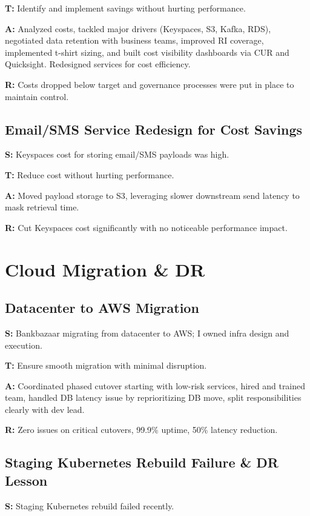 \documentclass[11pt]{article}
\begin{document}
\textbf{T:} Identify and implement savings without hurting performance.

\textbf{A:} Analyzed costs, tackled major drivers (Keyspaces, S3, Kafka, RDS), negotiated data retention with business teams, improved RI coverage, implemented t-shirt sizing, and built cost visibility dashboards via CUR and Quicksight. Redesigned services for cost efficiency.

\textbf{R:} Costs dropped below target and governance processes were put in place to maintain control.

\subsection{Email/SMS Service Redesign for Cost Savings}
\textbf{S:} Keyspaces cost for storing email/SMS payloads was high.

\textbf{T:} Reduce cost without hurting performance.

\textbf{A:} Moved payload storage to S3, leveraging slower downstream send latency to mask retrieval time.

\textbf{R:} Cut Keyspaces cost significantly with no noticeable performance impact.

\section{Cloud Migration \& DR}

\subsection{Datacenter to AWS Migration}
\textbf{S:} Bankbazaar migrating from datacenter to AWS; I owned infra design and execution.

\textbf{T:} Ensure smooth migration with minimal disruption.

\textbf{A:} Coordinated phased cutover starting with low-risk services, hired and trained team, handled DB latency issue by reprioritizing DB move, split responsibilities clearly with dev lead.

\textbf{R:} Zero issues on critical cutovers, 99.9\% uptime, 50\% latency reduction.

\subsection{Staging Kubernetes Rebuild Failure \& DR Lesson}
\textbf{S:} Staging Kubernetes rebuild failed recently.
\end{document}
